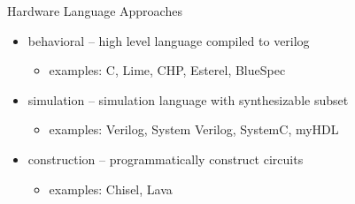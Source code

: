 \begin{frame}[fragile]{Hardware Language Approaches}
\begin{itemize}
\item {\color{magenta}behavioral} -- high level language compiled to verilog
\begin{itemize}
\item examples: C, Lime, CHP, Esterel, BlueSpec
\end{itemize}
\item {\color{orange}simulation} -- simulation language with synthesizable subset
\begin{itemize}
\item examples: Verilog, System Verilog, SystemC, myHDL
\end{itemize}
\item {\color{green}construction} -- programmatically construct circuits
\begin{itemize}
\item examples: Chisel, Lava
\end{itemize}
\end{itemize}
\end{frame}

